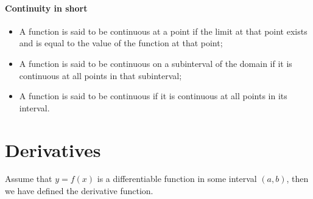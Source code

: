\documentclass{article}
\begin{document}
\begin{center}
\end{center}

\subsection{Continuity in short}
\begin{itemize}
    \item A function is said to be continuous at a point if the limit at that point exists and is equal to the value of the function at that point;
    \item A function is said to be continuous on a subinterval of the domain if it is continuous at all points in that subinterval;
    \item A function is said to be continuous if it is continuous at all points in its interval.
\end{itemize}

\newpage
\part{Derivatives}
Assume that $y=f(x)$ is a differentiable function in some interval $(a,b)$,
then we have defined the derivative function.
\end{document}
